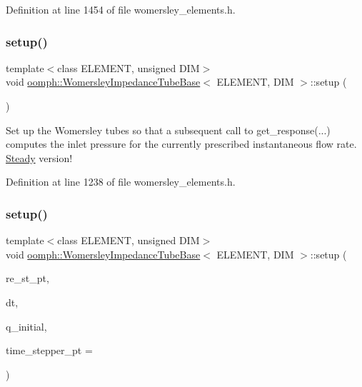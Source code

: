 Definition at line 1454 of file womersley\+\_\+elements.\+h.

\mbox{\label{classoomph_1_1WomersleyImpedanceTubeBase_a8524aff02e221d6fd8d9cfe58c2ef596}} 
\subsubsection{\texorpdfstring{setup()}{setup()}\hspace{0.1cm}{\footnotesize\ttfamily [1/2]}}
{\footnotesize\ttfamily template$<$class E\+L\+E\+M\+E\+NT, unsigned D\+IM$>$ \\
void \hyperlink{classoomph_1_1WomersleyImpedanceTubeBase}{oomph\+::\+Womersley\+Impedance\+Tube\+Base}$<$ E\+L\+E\+M\+E\+NT, D\+IM $>$\+::setup (\begin{DoxyParamCaption}{ }\end{DoxyParamCaption})\hspace{0.3cm}{\ttfamily [inline]}}



Set up the Womersley tubes so that a subsequent call to get\+\_\+response(...) computes the inlet pressure for the currently prescribed instantaneous flow rate. \hyperlink{classoomph_1_1Steady}{Steady} version! 



Definition at line 1238 of file womersley\+\_\+elements.\+h.

\mbox{\label{classoomph_1_1WomersleyImpedanceTubeBase_a912ef51e8ac9c44e80566126da7d591f}} 
\subsubsection{\texorpdfstring{setup()}{setup()}\hspace{0.1cm}{\footnotesize\ttfamily [2/2]}}
{\footnotesize\ttfamily template$<$class E\+L\+E\+M\+E\+NT, unsigned D\+IM$>$ \\
void \hyperlink{classoomph_1_1WomersleyImpedanceTubeBase}{oomph\+::\+Womersley\+Impedance\+Tube\+Base}$<$ E\+L\+E\+M\+E\+NT, D\+IM $>$\+::setup (\begin{DoxyParamCaption}\item[{double $\ast$}]{re\+\_\+st\+\_\+pt,  }\item[{const double \&}]{dt,  }\item[{const double \&}]{q\+\_\+initial,  }\item[{\hyperlink{classoomph_1_1TimeStepper}{Time\+Stepper} $\ast$}]{time\+\_\+stepper\+\_\+pt = {} }\end{DoxyParamCaption})\hspace{0.3cm}{\ttfamily [inline]}}



